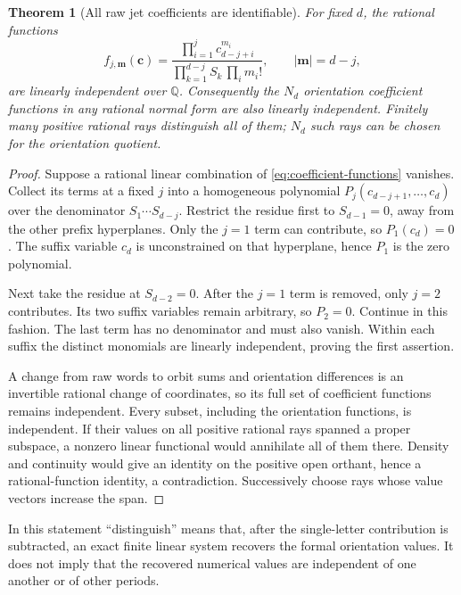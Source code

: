 \documentclass[11pt]{article}
\numberwithin{equation}{section}
\newtheorem{theorem}{Theorem}[section]
\theoremstyle{definition}
\newcommand{\bbm}{\boldsymbol m}
\newcommand{\bbc}{\boldsymbol c}
\begin{document}
\begin{theorem}[All raw jet coefficients are identifiable]\label{thm:identifiable}
For fixed $d$, the rational functions
\begin{equation}\label{eq:coefficient-functions}
 f_{j,\bbm}(\bbc)=
 \frac{\prod_{i=1}^j c_{d-j+i}^{m_i}}
      {\prod_{k=1}^{d-j}S_k\,\prod_i m_i!},
 \qquad |\bbm|=d-j,
\end{equation}
are linearly independent over $\mathbb Q$. Consequently the $N_d$
orientation coefficient functions in any rational normal form are also
linearly independent. Finitely many positive rational rays distinguish
all of them; $N_d$ such rays can be chosen for the orientation quotient.
\end{theorem}
\begin{proof}
Suppose a rational linear combination of \eqref{eq:coefficient-functions}
vanishes. Collect its terms at a fixed $j$ into a homogeneous polynomial
$P_j(c_{d-j+1},\ldots,c_d)$ over the denominator
$S_1\cdots S_{d-j}$. Restrict the residue first to $S_{d-1}=0$, away
from the other prefix hyperplanes. Only the $j=1$ term can contribute,
so $P_1(c_d)=0$. The suffix variable $c_d$ is unconstrained on that
hyperplane, hence $P_1$ is the zero polynomial.

Next take the residue at $S_{d-2}=0$. After the $j=1$ term is removed,
only $j=2$ contributes. Its two suffix variables remain arbitrary, so
$P_2=0$. Continue in this fashion. The last term has no denominator and
must also vanish. Within each suffix the distinct monomials are linearly
independent, proving the first assertion.

A change from raw words to orbit sums and orientation differences is an
invertible rational change of coordinates, so its full set of coefficient
functions remains independent. Every subset, including the orientation
functions, is independent. If their values on all positive rational rays
spanned a proper subspace, a nonzero linear functional would annihilate
all of them there. Density and continuity would give an identity on the
positive open orthant, hence a rational-function identity, a contradiction.
Successively choose rays whose value vectors increase the span.
\end{proof}

In this statement ``distinguish'' means that, after the single-letter
contribution is subtracted, an exact finite linear system recovers the
formal orientation values. It does not imply that the recovered numerical
values are independent of one another or of other periods.
\end{document}
